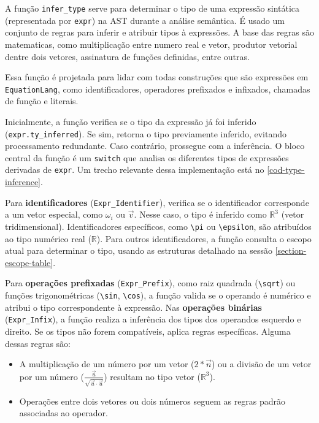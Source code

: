 A função \verb`infer_type` serve para determinar o tipo de uma expressão sintática (representada por \verb`expr`) na AST durante a análise semântica. É usado um conjunto de regras para inferir e atribuir tipos à expressões. A base das regras são matematicas, como multiplicação entre numero real e vetor, produtor vetorial dentre dois vetores, assinatura de funções definidas, entre outras.


Essa função é projetada para lidar com todas construções que são expressões em \texttt{EquationLang}, como identificadores, operadores prefixados e infixados, chamadas de função e literais.

Inicialmente, a função verifica se o tipo da expressão já foi inferido (\verb"expr.ty_inferred"). Se sim, retorna o tipo previamente inferido, evitando processamento redundante. Caso contrário, prossegue com a inferência. O bloco central da função é um \verb"switch" que analisa os diferentes tipos de expressões derivadas de \verb"expr". Um trecho relevante dessa implementação está no \autoref{cod-type-inference}.

Para \textbf{identificadores} (\verb"Expr_Identifier"), verifica se o identificador corresponde a um vetor especial, como $\omega_i$ ou $\vec{v}$. Nesse caso, o tipo é inferido como $\mathbb{R}^3$ (vetor tridimensional). Identificadores específicos, como \verb"\pi" ou \verb"\epsilon", são atribuídos ao tipo numérico real ($\mathbb{R}$). Para outros identificadores, a função consulta o escopo atual para determinar o tipo, usando as estruturas detalhado na sessão \autoref{section-escope-table}.



Para \textbf{operações prefixadas} (\verb"Expr_Prefix"), como raiz quadrada (\verb"\sqrt") ou funções trigonométricas (\verb"\sin", \verb"\cos"), a função valida se o operando é numérico e atribui o tipo correspondente à expressão. Nas \textbf{operações binárias} (\verb"Expr_Infix"), a função realiza a inferência dos tipos dos operandos esquerdo e direito. Se os tipos não forem compatíveis, aplica regras específicas. Alguma dessas regras são:

\begin{itemize}
    \item A multiplicação de um número por um vetor ($2*\vec{n}$) ou a divisão de um vetor por um número ($\frac{\vec{u}}{\sqrt{\vec{u} \cdot \vec{u}}}$) resultam no tipo vetor ($\mathbb{R}^3$).
    \item Operações entre dois vetores ou dois números seguem as regras padrão associadas ao operador.
\end{itemize}


